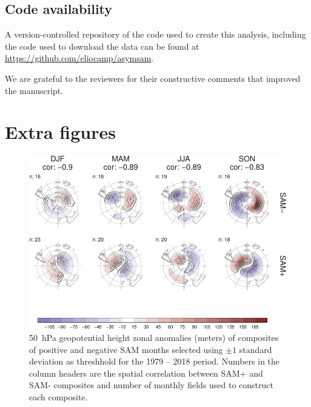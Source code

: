 \documentclass[smallextended]{svjour3}       %
\begin{document}
\hypertarget{code-availability}{%
\subsection*{Code availability}\label{code-availability}}

A version-controlled repository of the code used to create this analysis, including the code used to download the data can be found at \url{https://github.com/eliocamp/asymsam}.

\begin{acknowledgements}
We are grateful to the reviewers for their constructive comments that improved the manuscript.
\end{acknowledgements}

\newpage

\appendix


\hypertarget{extra-figures}{%
\section{Extra figures}\label{extra-figures}}

\newpage

\begin{figure}
\includegraphics{A3-1} \caption{50~hPa geopotential height zonal anomalies (meters) of composites of positive and negative SAM months selected using $\pm1$ standard deviation as threshhold for the 1979 -- 2018 period. Numbers in the column headers are the spatial correlation between SAM+ and SAM- composites and number of monthly fields used to construct each composite.}\label{fig:A3}
\end{figure}
\end{document}
